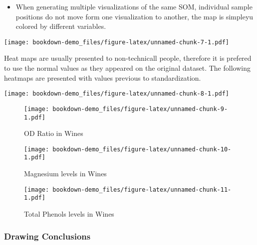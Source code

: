 \documentclass[]{book}
\newenvironment{Shaded}{\begin{snugshade}}{\end{snugshade}}
\newcommand{\KeywordTok}[1]{\textcolor[rgb]{0.13,0.29,0.53}{\textbf{{#1}}}}
\newcommand{\DataTypeTok}[1]{\textcolor[rgb]{0.13,0.29,0.53}{{#1}}}
\newcommand{\StringTok}[1]{\textcolor[rgb]{0.31,0.60,0.02}{{#1}}}
\newcommand{\CommentTok}[1]{\textcolor[rgb]{0.56,0.35,0.01}{\textit{{#1}}}}
\newcommand{\NormalTok}[1]{{#1}}
\providecommand{\tightlist}{%
  \setlength{\itemsep}{0pt}\setlength{\parskip}{0pt}}
\begin{document}
\begin{itemize}
\tightlist
\item
  When generating multiple visualizations of the same SOM, individual
  sample positions do not move form one visualization to another, the
  map is simpleyu colored by different variables.
\end{itemize}

\begin{Shaded}
\end{Shaded}

\texttt{[image: bookdown-demo\_files/figure-latex/unnamed-chunk-7-1.pdf]}

Heat maps are usually presented to non-technicall people, therefore it
is prefered to use the normal values as they appeared on the original
dataset. The following heatmaps are presented with values previous to
standardization.

\texttt{[image: bookdown-demo\_files/figure-latex/unnamed-chunk-8-1.pdf]}

\begin{figure}[htbp]
\centering
\texttt{[image: bookdown-demo\_files/figure-latex/unnamed-chunk-9-1.pdf]}
\caption{\label{fig:unnamed-chunk-9}OD Ratio in Wines}
\end{figure}

\begin{figure}[htbp]
\centering
\texttt{[image: bookdown-demo\_files/figure-latex/unnamed-chunk-10-1.pdf]}
\caption{\label{fig:unnamed-chunk-10}Magnesium levels in Wines}
\end{figure}

\begin{figure}[htbp]
\centering
\texttt{[image: bookdown-demo\_files/figure-latex/unnamed-chunk-11-1.pdf]}
\caption{\label{fig:unnamed-chunk-11}Total Phenols levels in Wines}
\end{figure}

\subsubsection{Drawing Conclusions}\label{drawing-conclusions}
\end{document}
